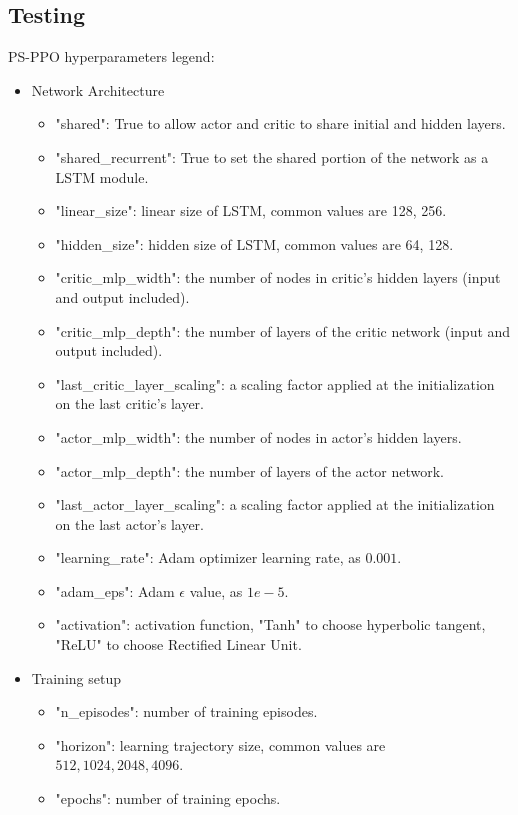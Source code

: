 \documentclass[11pt, a4paper, hidelinks]{report}
\begin{document}
\subsection{Testing}\label{subsec:testing}

PS-PPO hyperparameters legend:
\begin{itemize}
	\item Network Architecture
	\begin{itemize}
		\item "shared": True to allow actor and critic to share initial and hidden layers.
        	\item "shared\_recurrent": True to set the shared portion of the network as a LSTM module.
        	\item "linear\_size": linear size of LSTM, common values are 128, 256.
        	\item "hidden\_size": hidden size of LSTM, common values are 64, 128.
		\item "critic\_mlp\_width": the number of nodes in critic's hidden layers (input and output included).
		\item "critic\_mlp\_depth": the number of layers of the critic network (input and output included).
		\item "last\_critic\_layer\_scaling": a scaling factor applied at the initialization on the last critic's layer.
		\item "actor\_mlp\_width": the number of nodes in actor's hidden layers.
		\item "actor\_mlp\_depth": the number of layers of the actor network.
		\item "last\_actor\_layer\_scaling": a scaling factor applied at the initialization on the last actor's layer.
		\item "learning\_rate": Adam optimizer learning rate, as $0.001$.
		\item "adam\_eps": Adam $\epsilon$ value, as $1e-5$.
		\item "activation": activation function, "Tanh" to choose hyperbolic tangent, "ReLU" to choose Rectified Linear Unit.
	\end{itemize}
	\item Training setup
	\begin{itemize}
		\item "n\_episodes": number of training episodes.
		\item "horizon": learning trajectory size, common values are $512, 1024, 2048, 4096$.
		\item "epochs": number of training epochs.

\end{itemize}
\end{itemize}
\end{document}
